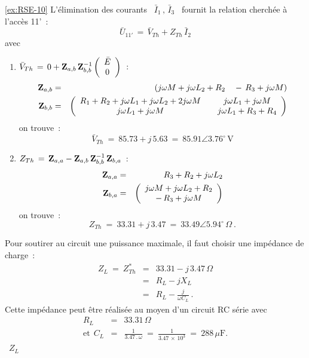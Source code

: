 \begin{solexercise}{\ref{ex:RSE-10}}
L'élimination des courants \ $\bar{I}_1\, , \, \bar{I}_3$ \ fournit la
relation cherchée à l'accès 11'~:
\[ \bar{U}_{11'} \, = \, \bar{V}_{Th} + Z_{Th} \, \bar{I}_2 \]
avec
\begin{enumerate}
	\item $\bar{V}_{Th} \, = \, 0 + {\bf Z}_{a,b} \, {\bf Z}_{b,b}^{-1} 
	\left( \begin{array}{c} \bar{E}\\ 0 \end{array} \right) $~:
	\begin{eqnarray*}
		{\bf Z}_{a,b} &=& \left( j\omega M + j\omega L_2 + R_2 ~~~-\, R_3 + j\omega M \right)\\
		{\bf Z}_{b,b} &=& \left( \begin{array}{ccc} 
			R_1 + R_2 + j\omega L_1 + j\omega L_2 + 2j\omega M && j\omega L_1 + j\omega M \\
			j\omega L_1 + j\omega M && j\omega L_1 + R_3 + R_4
		\end{array} \right)
	\end{eqnarray*}
	on trouve~: 
	\[ \bar{V}_{Th} \: = \: 85.73 + j\, 5.63 \: = \: 85.91 \angle 3.76^{\circ} \, \text{V} \]
	\item $Z_{Th} \, = \, {\bf Z}_{a,a} - {\bf Z}_{a,b} \, {\bf Z}_{b,b}^{-1} \, {\bf Z}_{b,a}$~:
	\begin{eqnarray*}
		{\bf Z}_{a,a} &=& R_3 + R_2 + j\omega L_2\\
		{\bf Z}_{b,a} &=& \left( \begin{array}{c}
			j\omega M + j\omega L_2 + R_2\\ -\, R_3 + j\omega M
		\end{array} \right) 
	\end{eqnarray*}
	on trouve~:
	\[ Z_{Th} \: = \: 33.31 + j\, 3.47 \: = \: 33.49 \angle 5.94^{\circ}\, \Omega~. \]
\end{enumerate}


Pour soutirer au circuit une puissance maximale, il faut choisir une impédance de charge~:
\begin{eqnarray*}
	Z_L \: = \: Z_{Th}^{\ast} &=& 33.31 - j\, 3.47 \, \Omega\\
	&=& R_L - jX_L\\
	& = & R_L - \frac{j}{\omega C_L}~. 
\end{eqnarray*}
Cette impédance peut être réalisée au moyen d'un circuit RC série
avec
\begin{eqnarray*}
	R_L &=& 33.31 \, \Omega\\
	\mbox{et}~~C_L &=& \frac{1}{3.47\, . \, \omega} \: = \: \frac{1}{3.47\, \times \, 10^3} 
	\: = \: 288 \, \mu \text{F.}
\end{eqnarray*}
 \ $Z_L$


\end{solexercise}

